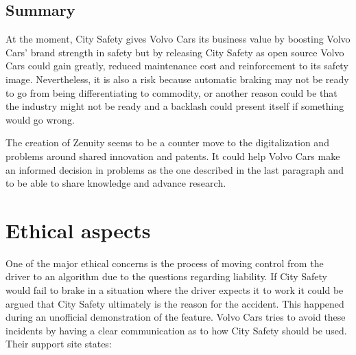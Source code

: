 \documentclass[conference]{IEEEtran}
\begin{document}
\subsection{Summary}
At the moment, City Safety gives Volvo Cars its business value by boosting Volvo Cars' brand strength in safety but by releasing City Safety as open source Volvo Cars could gain greatly, reduced maintenance cost and reinforcement to its safety image. Nevertheless, it is also a risk because automatic braking may not be ready to go from being differentiating to commodity, or another reason could be that the industry might not be ready and a backlash could present itself if something would go wrong.

The creation of Zenuity seems to be a counter move to the digitalization and problems around shared innovation and patents. It could help Volvo Cars make an informed decision in problems as the one described in the last paragraph and to be able to share knowledge and advance research.



\section{Ethical aspects}
One of the major ethical concerns is the process of moving control from the driver to an algorithm due to the questions regarding liability. If City Safety would fail to brake in a situation where the driver expects it to work it could be argued that City Safety ultimately is the reason for the accident. This happened during an unofficial demonstration of the feature. \cite{CitySafetyFail} Volvo Cars tries to avoid these incidents by having a clear communication as to how City Safety should be used. Their support site states:
\end{document}
